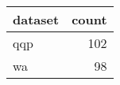 \begin{tabular}{lr}
\toprule
dataset & count \\
\midrule
qqp & 102 \\
wa & 98 \\
\bottomrule
\end{tabular}
